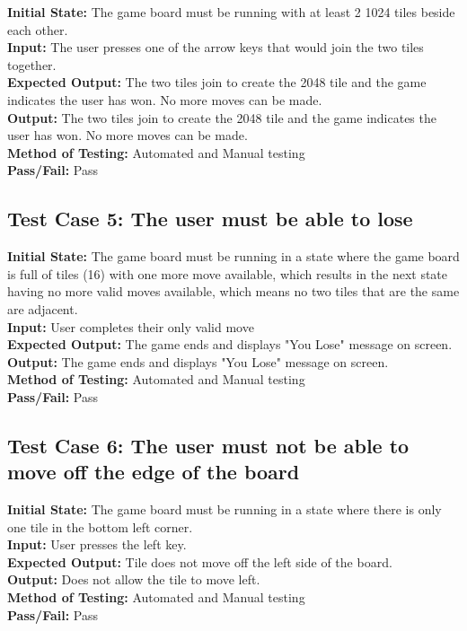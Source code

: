 \documentclass[12pt]{article}
\begin{document}
\textbf{Initial State:} The game board must be running with at least 2 1024 tiles beside
each other.\\
\textbf{Input:} The user presses one of the arrow keys that would join the two tiles together.\\
\textbf{Expected Output:} The two tiles join to create the 2048 tile and the game indicates the user has won. No more moves can be made.\\
\textbf{Output:} The two tiles join to create the 2048 tile and the game indicates the user has won. No more moves can be made.\\
\textbf{Method of Testing:} Automated and Manual testing\\
\textbf{Pass/Fail:} Pass

\subsection{Test Case 5: The user must be able to lose}

\textbf{Initial State:} The game board must be running in a state where the game board is full of tiles (16) with one more move available, which results in the next state having no more valid moves available, which means no two tiles that are the same are adjacent.\\
\textbf{Input:} User completes their only valid move\\
\textbf{Expected Output:} The game ends and displays "You Lose" message on screen.\\
\textbf{Output:} The game ends and displays "You Lose" message on screen.\\
\textbf{Method of Testing:} Automated and Manual testing\\
\textbf{Pass/Fail:} Pass

\subsection{Test Case 6: The user must not be able to move off the edge of the board}

\textbf{Initial State:} The game board must be running in a state where there is only one tile in the bottom left corner.\\
\textbf{Input:} User presses the left key.\\
\textbf{Expected Output:} Tile does not move off the left side of the board.\\
\textbf{Output:} Does not allow the tile to move left.\\
\textbf{Method of Testing:} Automated and Manual testing\\
\textbf{Pass/Fail:} Pass
\end{document}
